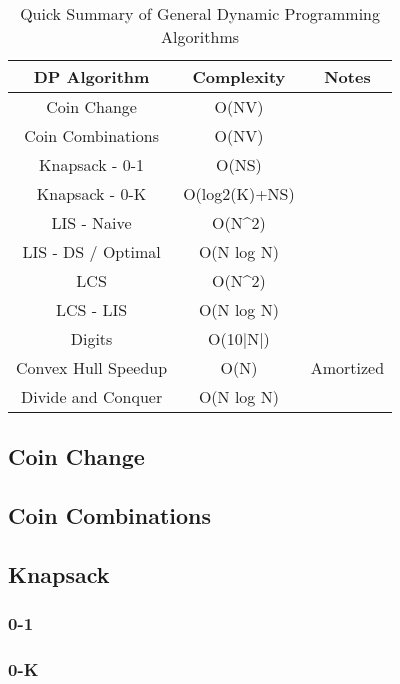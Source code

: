 \documentclass{article}
\begin{document}
\begin{table}[H]
\begin{tabular}{|c|c|c|}
\hline
DP Algorithm        & Complexity              & Notes     \\ \hline
Coin Change         & O(NV)                   &           \\ \hline
Coin Combinations   & O(NV)                   &           \\ \hline
Knapsack - 0-1      & O(NS)                   &           \\ \hline
Knapsack - 0-K      & O(log2(K)+NS)           &           \\ \hline
LIS - Naive         & O(N\textasciicircum{}2) &           \\ \hline
LIS - DS / Optimal  & O(N log N)              &           \\ \hline
LCS                 & O(N\textasciicircum{}2) &           \\ \hline
LCS - LIS           & O(N log N)              &           \\ \hline
Digits              & O(10|N|)                &           \\ \hline
Convex Hull Speedup & O(N)                    & Amortized \\ \hline
Divide and Conquer  & O(N log N)              &           \\ \hline
\end{tabular}
\caption{Quick Summary of General Dynamic Programming Algorithms}
\label{tab:dp}
\end{table}

\subsection{Coin Change}

\subsection{Coin Combinations}


\subsection{Knapsack}
\subsubsection{0-1}

\subsubsection{0-K}

\end{document}

